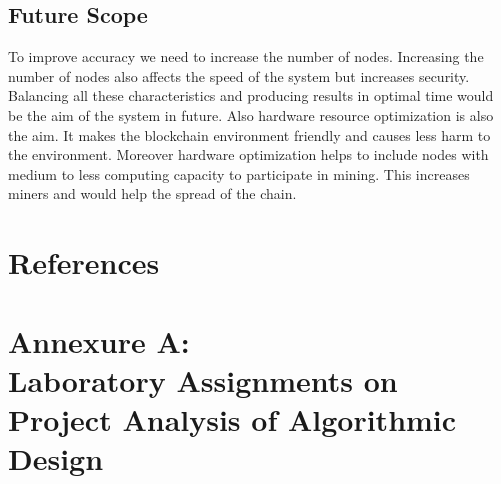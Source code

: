 \documentclass[oneside, 12pt]{book}
\begin{document}
\subsection{Future Scope}
To improve accuracy we need to increase the number of nodes. Increasing the number of nodes also affects the speed of the system but increases security. Balancing all these characteristics and producing results in optimal time would be the aim of the system in future. Also hardware resource optimization is also the aim. It makes the blockchain environment friendly and causes less harm to the environment. Moreover hardware optimization helps to include nodes with medium to less computing capacity to participate in mining. This increases miners and  would help the spread of the chain.
\newpage
\section{References}
\newpage


\newpage
\section{Annexure A:\\Laboratory Assignments on Project Analysis of Algorithmic Design}
\newpage
\end{document}
